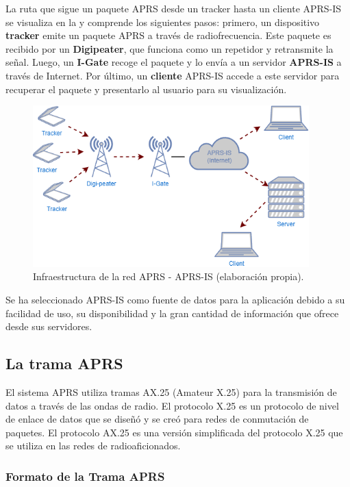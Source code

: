 La ruta que sigue un paquete APRS desde un tracker hasta un cliente APRS-IS se visualiza en la  y comprende los siguientes pasos: primero, un dispositivo \textbf{tracker} emite un paquete APRS a través de radiofrecuencia. Este paquete es recibido por un \textbf{Digipeater}, que funciona como un repetidor y retransmite la señal. Luego, un \textbf{I-Gate} recoge el paquete y lo envía a un servidor \textbf{APRS-IS} a través de Internet. Por último, un \textbf{cliente} APRS-IS accede a este servidor para recuperar el paquete y presentarlo al usuario para su visualización.

\begin{figure}[!h]
	\centering
	\includegraphics[width=0.95\textwidth]{Imagenes/Chapter_4/aprs_infra.png}
	\caption[Infraestructura de la red APRS - APRS-IS.]{Infraestructura de la red APRS - APRS-IS (elaboración propia).}
	\label{fig:aprs-infra}
\end{figure}

\FloatBarrier

Se ha seleccionado APRS-IS como fuente de datos para la aplicación debido a su facilidad de uso, su disponibilidad y la gran cantidad de información que ofrece desde sus servidores.

\subsection{La trama APRS}
El sistema APRS utiliza tramas AX.25 (Amateur X.25) para la transmisión de datos a través de las ondas de radio. El protocolo X.25 es un protocolo de nivel de enlace de datos que se diseñó y se creó para redes de conmutación de paquetes. El protocolo AX.25 es una versión simplificada del protocolo X.25 que se utiliza en las redes de radioaficionados.

\subsubsection*{Formato de la Trama APRS}

